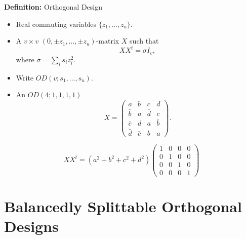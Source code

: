 \documentclass{beamer}
\begin{document}
\begin{frame}

  \begin{block}{{\bf Definition:} Orthogonal Design}
    \begin{itemize}
    \item Real commuting variables $\{z_1, \dots, z_u\}$.
    \item A $v \times v$ $(0,\pm z_1, \dots, \pm z_u)$-matrix $X$ such that
      \[
        XX^t = \sigma I_v,
      \]
      where $\sigma = \sum_i s_iz_i^2$.
    \item Write $OD(v; s_1, \dots, s_u)$.
    \end{itemize}
  \end{block}
  
\end{frame}

\begin{frame}

  \begin{itemize}
  \item An $OD(4;1,1,1,1)$
    \[
      X = 
      \begin{pmatrix}
        a & b & c & d \\
        \bar b & a & \bar d & c \\
        \bar c & d & a & \bar b \\
        \bar d & \bar c & b & a
      \end{pmatrix}.
    \]
  \end{itemize}
  
\end{frame}

\begin{frame}

  \[
    XX^t = (a^2+b^2+c^2+d^2)
    \begin{pmatrix}
      1 & 0 & 0 & 0 \\
      0 & 1 & 0 & 0 \\
      0 & 0 & 1 & 0 \\
      0 & 0 & 0 & 1
    \end{pmatrix}
  \]
  
\end{frame}


\section{Balancedly Splittable Orthogonal Designs}
\end{document}

